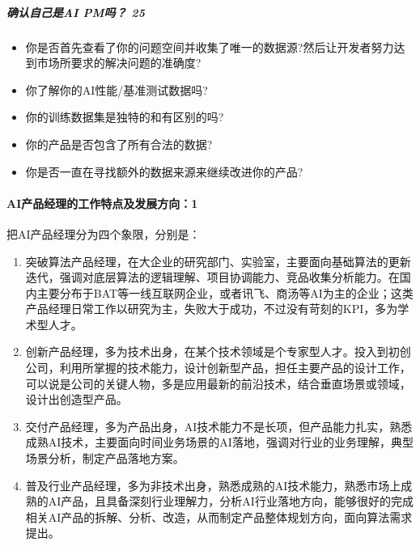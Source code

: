 \documentclass[letterpaper,10pt,english]{sphinxmanual}
\begin{document}
\subparagraph{确认自己是AI PM吗？ 25\sphinxfootnotemark[270]}
\label{\detokenize{chapter_introduction/AI_PM:ai-pm-25}}%
\begin{footnotetext}[270]\sphinxAtStartFootnote
{}
%
\end{footnotetext}\ignorespaces \begin{itemize}
\item {} 
你是否首先查看了你的问题空间并收集了唯一的数据源?然后让开发者努力达到市场所要求的解决问题的准确度?

\item {} 
你了解你的AI性能/基准测试数据吗?

\item {} 
你的训练数据集是独特的和有区别的吗?

\item {} 
你的产品是否包含了所有合法的数据?

\item {} 
你是否一直在寻找额外的数据来源来继续改进你的产品?

\end{itemize}


\paragraph{AI产品经理的工作特点及发展方向：1\sphinxfootnotemark[271]}
\label{\detokenize{chapter_introduction/AI_PM:ai-1}}%
\begin{footnotetext}[271]\sphinxAtStartFootnote
{}
%
\end{footnotetext}\ignorespaces 
把AI产品经理分为四个象限，分别是：
\begin{enumerate}
%
\item {} 
突破算法产品经理，在大企业的研究部门、实验室，主要面向基础算法的更新迭代，强调对底层算法的逻辑理解、项目协调能力、竞品收集分析能力。在国内主要分布于BAT等一线互联网企业，或者讯飞、商汤等AI为主的企业；这类产品经理日常工作以研究为主，失败大于成功，不过没有苛刻的KPI，多为学术型人才。

\item {} 
创新产品经理，多为技术出身，在某个技术领域是个专家型人才。投入到初创公司，利用所掌握的技术能力，设计创新型产品，担任主要产品的设计工作，可以说是公司的关键人物，多是应用最新的前沿技术，结合垂直场景或领域，设计出创造型产品。

\item {} 
交付产品经理，多为产品出身，AI技术能力不是长项，但产品能力扎实，熟悉成熟AI技术，主要面向时间业务场景的AI落地，强调对行业的业务理解，典型场景分析，制定产品落地方案。

\item {} 
普及行业产品经理，多为非技术出身，熟悉成熟的AI技术能力，熟悉市场上成熟的AI产品，且具备深刻行业理解力，分析AI行业落地方向，能够很好的完成相关AI产品的拆解、分析、改造，从而制定产品整体规划方向，面向算法需求提出。

\end{enumerate}
\end{document}
